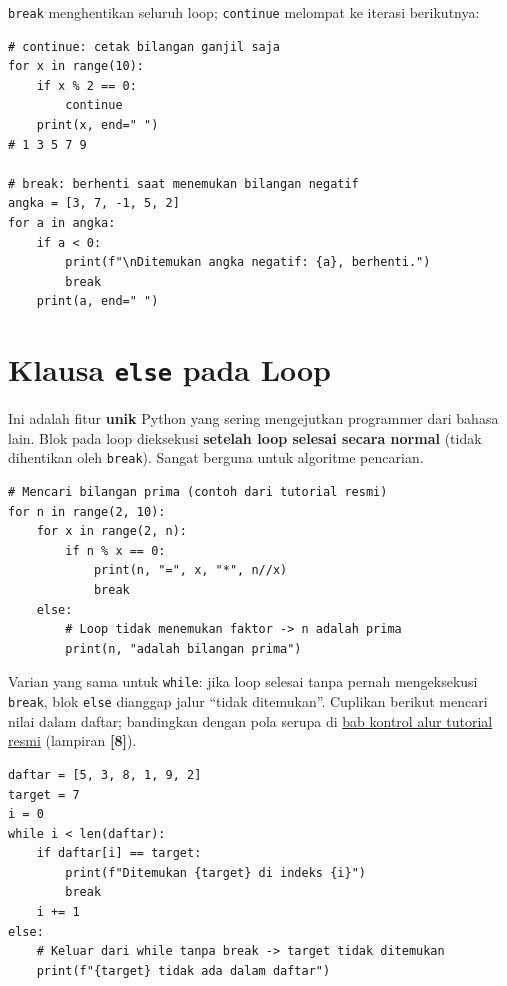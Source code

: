 ﻿\documentclass[../main.tex]{subfiles}
\begin{document}
\texttt{break} menghentikan seluruh loop; \texttt{continue} melompat ke iterasi berikutnya:

\begin{lstlisting}[caption=break dan continue]
# continue: cetak bilangan ganjil saja
for x in range(10):
    if x % 2 == 0:
        continue
    print(x, end=" ")
# 1 3 5 7 9

# break: berhenti saat menemukan bilangan negatif
angka = [3, 7, -1, 5, 2]
for a in angka:
    if a < 0:
        print(f"\nDitemukan angka negatif: {a}, berhenti.")
        break
    print(a, end=" ")
\end{lstlisting}

\section{Klausa \texttt{else} pada Loop}

Ini adalah fitur \textbf{unik} Python yang sering mengejutkan programmer dari bahasa lain. Blok  pada loop dieksekusi \textbf{setelah loop selesai secara normal} (tidak dihentikan oleh \texttt{break}). Sangat berguna untuk algoritme pencarian.

\begin{lstlisting}[caption=else pada loop for (Tutorial Python ss4.5)]
# Mencari bilangan prima (contoh dari tutorial resmi)
for n in range(2, 10):
    for x in range(2, n):
        if n % x == 0:
            print(n, "=", x, "*", n//x)
            break
    else:
        # Loop tidak menemukan faktor -> n adalah prima
        print(n, "adalah bilangan prima")
\end{lstlisting}

\noindent Varian yang sama untuk \texttt{while}: jika loop selesai tanpa pernah mengeksekusi \texttt{break}, blok \texttt{else} dianggap jalur ``tidak ditemukan''. Cuplikan berikut mencari nilai dalam daftar; bandingkan dengan pola serupa di \href{https://docs.python.org/3/tutorial/controlflow.html}{bab kontrol alur tutorial resmi} (lampiran \textbf{[8]}).

\begin{lstlisting}[caption=else pada loop while: pencarian nilai]
daftar = [5, 3, 8, 1, 9, 2]
target = 7
i = 0
while i < len(daftar):
    if daftar[i] == target:
        print(f"Ditemukan {target} di indeks {i}")
        break
    i += 1
else:
    # Keluar dari while tanpa break -> target tidak ditemukan
    print(f"{target} tidak ada dalam daftar")
\end{lstlisting}
\end{document}
